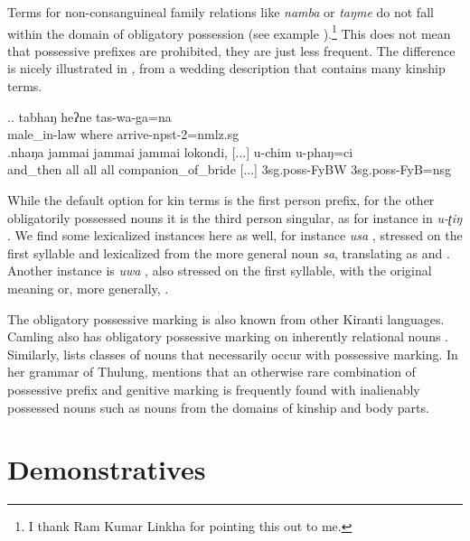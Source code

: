 Terms for non-consanguineal family relations like \emph{namba}  or \emph{taŋme}  do not fall within the domain of obligatory possession (see example \Next[a]).\footnote{I thank Ram Kumar Linkha for pointing this out to me.} This does not mean that possessive prefixes are prohibited, they are just less frequent. The difference is nicely illustrated in \Next[b], from a wedding description that contains many kinship terms. 

\ex.\ag. tabhaŋ heʔne tas-wa-ga=na\\
 	male\_in-law where arrive{\sc -npst-2=nmlz.sg}\\
\bg.nhaŋa   jammai jammai jammai lokondi,     [...] u-chim u-phaŋ=ci \\
and\_then all all all companion\_of\_bride [...] {\sc 3sg.poss-}FyBW {\sc 3sg.poss-}FyB{\sc =nsg}\\
 
	
While the default option for kin terms is the first person prefix, for the other obligatorily possessed nouns it is the third person singular, as for instance in \emph{u-ʈiŋ} . We find some lexicalized instances here as well, for instance \emph{usa} , stressed on the first syllable and lexicalized from the more general noun \emph{sa}, translating as  and . Another instance is \emph{uwa} , also stressed on the first syllable, with the original meaning  or, more generally, . 

The obligatory possessive marking is also known from other Kiranti languages. Camling also has obligatory possessive marking on inherently relational nouns \citep[41]{Ebert1997Camling}. Similarly, \citet[98-100]{Doornenbal2009A-grammar} lists  classes of nouns that necessarily occur with possessive marking. In her grammar of Thulung, \citet[72]{Lahaussois2002Thulung} mentions that an otherwise rare combination of possessive prefix and genitive marking is frequently found with inalienably possessed nouns such as nouns from the domains of kinship and body parts.




\section{Demonstratives} \label{dem-pron}

